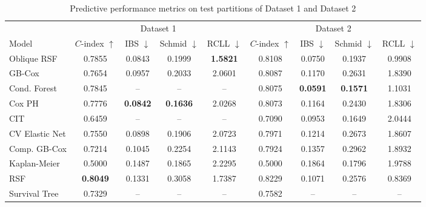 \documentclass[pdflatex,sn-mathphys-ay]{sn-jnl}%
\theoremstyle{thmstyleone}%
\theoremstyle{thmstyletwo}%
\theoremstyle{thmstylethree}%
\begin{document}
\begin{table}
\centering
\small
\caption{Predictive performance metrics on test partitions of Dataset 1 and Dataset 2}\label{tab:performance_comparison}
\begin{tabular*}{\textwidth}{@{\extracolsep{\fill}} lcccccccc}
\toprule
& \multicolumn{4}{c}{Dataset 1} & \multicolumn{4}{c}{Dataset 2} \\
\cmidrule(lr){2-5} \cmidrule(lr){6-9}
Model & $C$-index $\uparrow$ & IBS $\downarrow$ & Schmid $\downarrow$ & RCLL $\downarrow$ & $C$-index $\uparrow$ & IBS $\downarrow$ & Schmid $\downarrow$ & RCLL $\downarrow$ \\
\midrule
\quad Oblique RSF & 0.7855 & 0.0843 & 0.1999 & \textbf{1.5821} & 0.8108 & 0.0750 & 0.1937 & 0.9908 \\
\quad GB-Cox & 0.7654 & 0.0957 & 0.2033 & 2.0601 & 0.8087 & 0.1170 & 0.2631 & 1.8390 \\
\quad Cond. Forest & 0.7845 & -- & -- & -- & 0.8075 & \textbf{0.0591} & \textbf{0.1571} & 1.1031 \\
\quad Cox PH & 0.7776 & \textbf{0.0842} & \textbf{0.1636} & 2.0268 & 0.8073 & 0.1164 & 0.2430 & 1.8306 \\
\quad CIT & 0.6459 & -- & -- & -- & 0.7090 & 0.0953 & 0.1649 & 2.0444 \\
\quad CV Elastic Net & 0.7550 & 0.0898 & 0.1906 & 2.0723 & 0.7971 & 0.1214 & 0.2673 & 1.8607 \\
\quad Comp. GB-Cox & 0.7214 & 0.1045 & 0.2254 & 2.1143 & 0.7924 & 0.1357 & 0.2962 & 1.8932 \\
\quad Kaplan-Meier & 0.5000 & 0.1487 & 0.1865 & 2.2295 & 0.5000 & 0.1864 & 0.1796 & 1.9788 \\
\quad RSF & \textbf{0.8049} & 0.1331 & 0.3058 & 1.7387 & 0.8229 & 0.1071 & 0.2576 & 0.8369 \\
\quad Survival Tree & 0.7329 & -- & -- & -- & 0.7582 & -- & -- & -- \\
\bottomrule
\end{tabular*}
\end{table}
\end{document}
